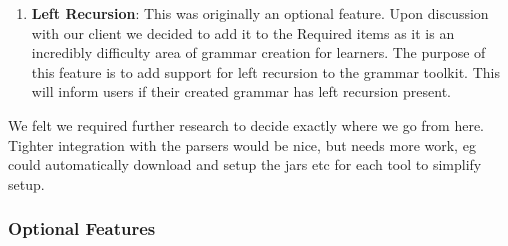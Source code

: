 \begin{enumerate}
	\item \textbf{Left Recursion}:  This was originally an optional feature. Upon discussion with our client we decided to add it to the Required items as it is an incredibly difficulty area of grammar creation for learners. The purpose of this feature is to add support for left recursion to the grammar toolkit. This will inform users if their created grammar has left recursion present. 
\end {enumerate}
We felt we required further research to decide exactly where we go from here. Tighter integration with the parsers would be nice, but needs more work, eg could automatically download and setup the jars etc for each tool to simplify setup.

\subsubsection{Optional Features}
